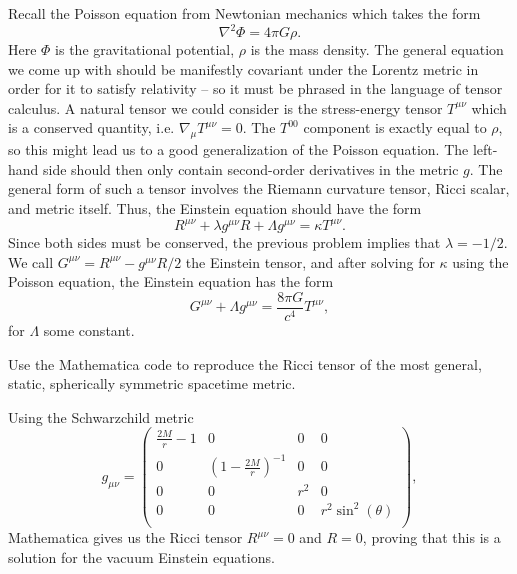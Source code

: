 \documentclass{../../templates/lkx_pset}
\begin{document}
\begin{solution}
  Recall the Poisson equation from Newtonian mechanics which takes the form
  \[
      \nabla^2 \Phi = 4\pi G \rho.
  \]
  Here $\Phi$ is the gravitational potential, $\rho$ is the mass density. The general equation we come up with should be manifestly covariant under the Lorentz metric in order for it to satisfy relativity -- so it must be phrased in the language of tensor calculus. A natural tensor we could consider is the stress-energy tensor $T^{\mu\nu}$ which is a conserved quantity, i.e. $\nabla_\mu T^{\mu\nu} = 0$. The $T^{00}$ component is exactly equal to $\rho$, so this might lead us to a good generalization of the Poisson equation. The left-hand side should then only contain second-order derivatives in the metric $g$. The general form of such a tensor involves the Riemann curvature tensor, Ricci scalar, and metric itself. Thus, the Einstein equation should have the form
  \[
    R^{\mu\nu} + \lambda g^{\mu\nu} R + \Lambda g^{\mu\nu} = \kappa T^{\mu\nu}.
  \]
  Since both sides must be conserved, the previous problem implies that $\lambda=-1/2$. We call $G^{\mu\nu} = R^{\mu\nu}-g^{\mu\nu}R/2$ the Einstein tensor, and after solving for $\kappa$ using the Poisson equation, the Einstein equation has the form
  \[
    G^{\mu\nu} + \Lambda g^{\mu\nu} = \frac{8\pi G}{c^4}T^{\mu\nu},
  \]
  for $\Lambda$ some constant.
\end{solution}

\begin{problem}{7}
  Use the Mathematica code to reproduce the Ricci tensor of the most general, static, spherically symmetric spacetime metric.
\end{problem}

\begin{solution}
  Using the Schwarzchild metric
  \[
    g_{\mu\nu} = 
\left(
\begin{array}{cccc}
 \frac{2 M}{r}-1 & 0 & 0 & 0 \\
 0 & \left(1-\frac{2 M}{r}\right)^{-1} & 0 & 0 \\
 0 & 0 & r^2 & 0 \\
 0 & 0 & 0 & r^2 \sin ^2(\theta) \\
\end{array}
\right),
\]
Mathematica gives us the Ricci tensor $R^{\mu\nu}=0$ and $R=0$, proving that this is a solution for the vacuum Einstein equations.
\end{solution}
\end{document}
